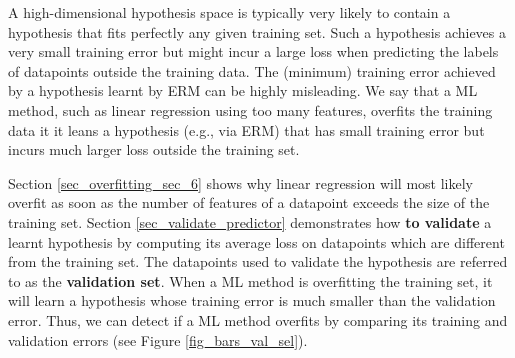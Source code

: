 \documentclass[12pt]{report}
\begin{document}
A high-dimensional hypothesis space is typically very likely to contain a hypothesis that fits perfectly 
any given training set. Such a hypothesis achieves a very small training error but might 
incur a large loss when predicting the labels of datapoints outside the training data. The 
(minimum) training error achieved by a hypothesis learnt by ERM can be highly misleading. 
We say that a ML method, such as linear regression using too many features, overfits the 
training data it it leans a hypothesis (e.g., via ERM) that has small training error but incurs 
much larger loss outside the training set. 


Section \ref{sec_overfitting_sec_6} shows why linear regression will most 
likely overfit as soon as the number of features of a datapoint exceeds 
the size of the training set. Section \ref{sec_validate_predictor} demonstrates 
how {\bf to validate} a learnt hypothesis by computing its 
average loss on datapoints which are different from the training set. 
The datapoints used to validate the hypothesis are referred to as the 
{\bf validation set}. When a ML method is overfitting the training set, 
it will learn a hypothesis whose training error is much smaller than 
the validation error. Thus, we can detect if a ML method overfits by 
comparing its training and validation errors (see Figure \ref{fig_bars_val_sel}). 

%
%
\end{document}
